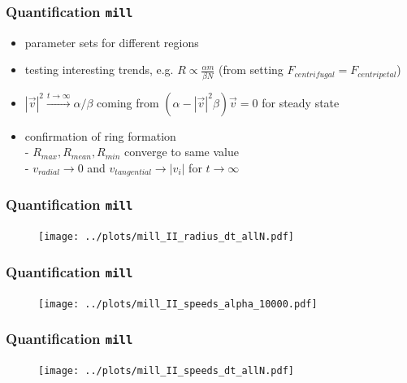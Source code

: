 \documentclass[compress]{beamer}
\begin{document}
\begin{frame}
	\frametitle{Quantification \texttt{mill}}
\begin{itemize}
	\item parameter sets for different regions
	\item testing interesting trends, e.g. \( R \propto \frac{\alpha m}{\beta N}\) (from setting \( F_{centrifugal} = F_{centripetal} \))
	\item \( |\vec{v}|^{2}  \xrightarrow{t \to \infty}  \alpha / \beta \) coming from \( (\alpha - |\vec{v}|^2 \beta ) \vec{v} = 0 \) for steady state
	\item confirmation of ring formation \\
	- \( R_{max}, R_{mean}, R_{min} \) converge to same value \\
	- \( v_{radial} \to 0 \) and \( v_{tangential} \to | v_{i} |  \) for \( t \to \infty \)
\end{itemize}
\end{frame}


\begin{frame}
	\frametitle{Quantification \texttt{mill}}	
	\begin{figure}[H]
		\texttt{[image: ../plots/mill\_II\_radius\_dt\_allN.pdf]}
	\end{figure}	
\end{frame}



\begin{frame}
	\frametitle{Quantification \texttt{mill}}	
	\begin{figure}[H]
		\texttt{[image: ../plots/mill\_II\_speeds\_alpha\_10000.pdf]}
	\end{figure}	
\end{frame}


\begin{frame}
	\frametitle{Quantification \texttt{mill}}	
	\begin{figure}[H]
		\texttt{[image: ../plots/mill\_II\_speeds\_dt\_allN.pdf]}
	\end{figure}	
\end{frame}
\end{document}
